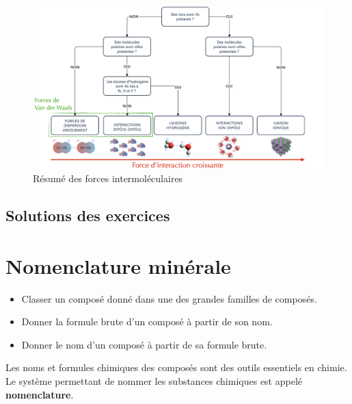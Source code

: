 \documentclass[
  11pt,
  a4paper,
  openany]{book}
\providecommand{\tightlist}{%
  \setlength{\itemsep}{0pt}\setlength{\parskip}{0pt}}
\begin{document}
\begin{figure}

{\centering \includegraphics[width=1\linewidth]{images/forces-intermoleculaires-resume} 

}

\caption{Résumé des forces intermoléculaires}\label{fig:forces-intermoleculaires-resume}
\end{figure}

\section{Solutions des exercices} \shipoutAnswer

\hypertarget{nomenclature-minuxe9rale}{%
\chapter{Nomenclature minérale}\label{nomenclature-minuxe9rale}}

\begin{objectives}

\begin{itemize}
\tightlist
\item
  Classer un composé donné dans une des grandes familles de composés.
\item
  Donner la formule brute d'un composé à partir de son nom.
\item
  Donner le nom d'un composé à partir de sa formule brute.
\end{itemize}

\end{objectives}

Les noms et formules chimiques des composés sont des outils essentiels en chimie. Le système permettant de nommer les substances chimiques est appelé \textbf{nomenclature}.
\end{document}
